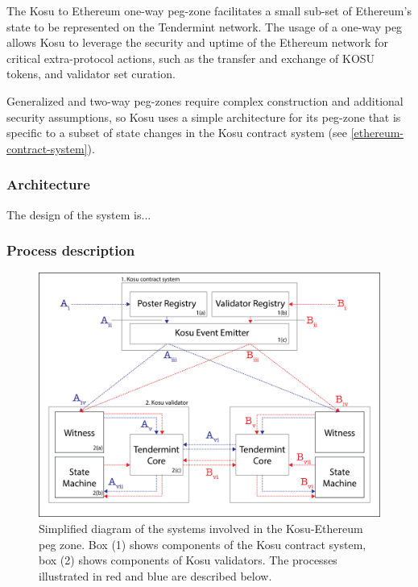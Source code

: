 \documentclass[10pt]{article}
\begin{document}
The Kosu to Ethereum one-way peg-zone facilitates a small sub-set of Ethereum's state to be represented on the Tendermint network. The usage of a one-way peg allows Kosu to leverage the security and uptime of the Ethereum network for critical extra-protocol actions, such as the transfer and exchange of KOSU tokens, and validator set curation.
\medskip

Generalized and two-way peg-zones require complex construction\cite{peggy-spec} and additional security assumptions, so Kosu uses a simple architecture for its peg-zone that is specific to a subset of state changes in the Kosu contract system (see \ref{ethereum-contract-system}).

\subsubsection{Architecture}\label{peg-architecture}
The design of the system is...

\subsubsection{Process description}\label{peg-process}
\begin{figure}[H]
  \centering
  \includegraphics[width=\textwidth]{../figures/fig1.png}
  \caption{Simplified diagram of the systems involved in the Kosu-Ethereum peg zone. Box (1) shows components of the Kosu contract system, box (2) shows components of Kosu validators. The processes illustrated in red and blue are described below.}
  \label{fig:fig2}
\end{figure}
\end{document}
